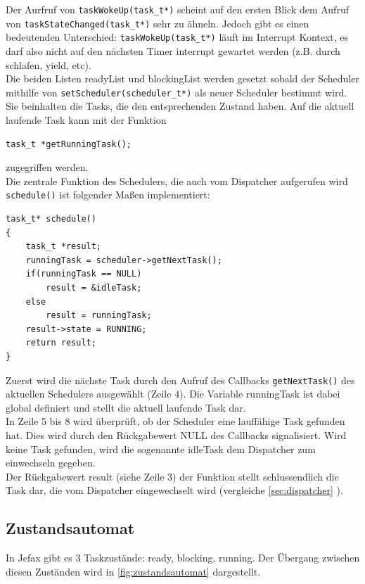 \documentclass[fontsize=12pt, toc=bibliography, notitlepage]{scrreprt}
\newcommand{\refnn}[1]{\ref{#1} \nameref{#1}}
\begin{document}
Der Aurfruf von \lstinline$taskWokeUp(task_t*)$ scheint auf den ersten Blick dem Aufruf von \lstinline$taskStateChanged(task_t*)$ sehr zu ähneln. Jedoch gibt es einen bedeutenden Unterschied: \lstinline$taskWokeUp(task_t*)$ läuft im Interrupt Kontext, es darf also nicht auf den nächsten Timer interrupt gewartet werden (z.B. durch schlafen, yield, etc).\\

Die beiden Listen readyList und blockingList werden gesetzt sobald der Scheduler mithilfe von \lstinline$setScheduler(scheduler_t*)$ als neuer Scheduler bestimmt wird. Sie beinhalten die Tasks, die den entsprechenden Zustand haben. Auf die aktuell laufende Task kann mit der Funktion

\begin{lstlisting}
task_t *getRunningTask();
\end{lstlisting}

zugegriffen werden.\\

Die zentrale Funktion des Schedulers, die auch vom Dispatcher aufgerufen wird \lstinline$schedule()$ ist folgender Maßen implementiert:

\begin{lstlisting}[title=scheduler.c]
task_t* schedule()
{
	task_t *result;
	runningTask = scheduler->getNextTask();
	if(runningTask == NULL)
		result = &idleTask;
	else
		result = runningTask;
	result->state = RUNNING;
	return result;
}
\end{lstlisting}

Zuerst wird die nächste Task durch den Aufruf des Callbacks \lstinline$getNextTask()$ des aktuellen Schedulers ausgewählt (Zeile 4). Die Variable runningTask ist dabei global definiert und stellt die aktuell laufende Task dar.\\

In Zeile 5 bis 8 wird überprüft, ob der Scheduler eine lauffähige Task gefunden hat. Dies wird durch den Rückgabewert NULL des Callbacks signalisiert. Wird keine Task gefunden, wird die sogenannte idleTask dem Dispatcher zum einwechseln gegeben.\\

Der Rückgabewert result (siehe Zeile 3) der Funktion stellt schlussendlich die Task dar, die vom Dispatcher eingewechselt wird (vergleiche \refnn{sec:dispatcher}).

\subsection{Zustandsautomat}
\label{subsec:zustandsautomat}
In Jefax gibt es 3 Taskzustände: ready, blocking, running. Der Übergang zwischen diesen Zuständen wird in \autoref{fig:zustandsautomat} dargestellt.
\end{document}
